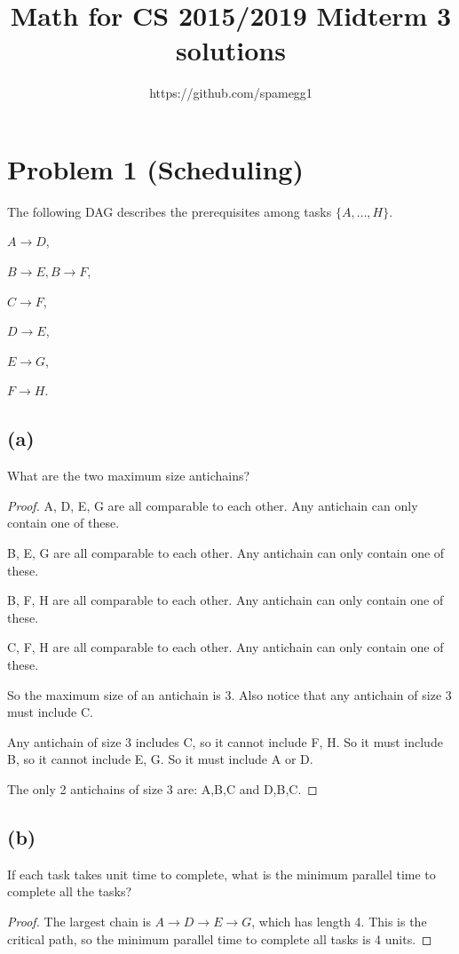\documentclass[14pt]{extarticle}
\title{Math for CS 2015/2019 Midterm 3 solutions}
\author{https://github.com/spamegg1}
\begin{document}
\maketitle
\tableofcontents

\section{Problem 1 (Scheduling)}
The following DAG describes the prerequisites among tasks $\{A, \ldots, H \}$.

$A \to D$,

$B \to E, B \to F$,

$C \to F$,

$D \to E$, 

$E \to G$,

$F \to H$.
\subsection{(a)}
What are the two maximum size antichains?
\begin{proof}
A, D, E, G are all comparable to each other. Any antichain can only contain one of these.

B, E, G are all comparable to each other. Any antichain can only contain one of these.

B, F, H are all comparable to each other. Any antichain can only contain one of these.

C, F, H are all comparable to each other. Any antichain can only contain one of these.

So the maximum size of an antichain is 3. Also notice that any antichain of size 3 must include C.

Any antichain of size 3 includes C, so it cannot include F, H. So it must include B, so it cannot include E, G. So it must include A or D.

The only 2 antichains of size 3 are: A,B,C and D,B,C.
\end{proof}

\subsection{(b)}
If each task takes unit time to complete, what is the minimum parallel time to complete all the tasks?
\begin{proof}
The largest chain is $A \to D \to E \to G$, which has length 4. This is the critical path, so the minimum parallel time to complete all tasks is 4 units.
\end{proof}
\end{document}
